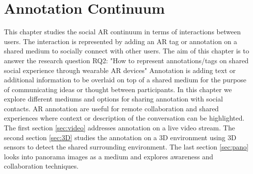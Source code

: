 \chapter{Annotation Continuum} %
\label{ch:annotation} %

This chapter studies the social AR continuum in terms of interactions between users. The interaction is represented by adding an AR tag or annotation on a shared medium to socially connect with other users. 
The aim of this chapter is to answer the research question RQ2: "How to represent annotations/tags on shared social experience through wearable AR devices"
Annotation is adding text or additional information to be overlaid on top of a shared medium for the purpose of communicating ideas or thought between participants. In this chapter we explore different mediums and options for sharing annotation with social contacts. AR annotation are useful for remote collaboration and shared experiences where context or description of the conversation can be highlighted.  
The first section \ref{sec:video} addresses annotation on a live video stream. The second section \ref{sec:3D} studies the annotation on a 3D environment using 3D sensors to detect the shared surrounding environment. The last section \ref{sec:pano} looks into panorama images as a medium and explores awareness and collaboration techniques. 






